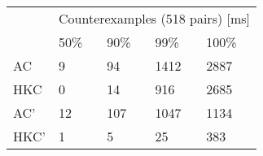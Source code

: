 \begin{tabular}{l|llll}
\multirow{2}{*}{} & \multicolumn{4}{c}{Counterexamples (518 pairs) {[}ms{]}} \\ \cline{2-5}
                  & 50\% & 90\%  & 99\%  & 100\%     \\ \hline
AC                & 9    & 94    & 1412  & 2887     \\
HKC               & 0    & 14    & 916   & 2685     \\
AC'               & 12   & 107   & 1047  & 1134     \\
HKC'              & 1    & 5     & 25    & 383
\end{tabular}
